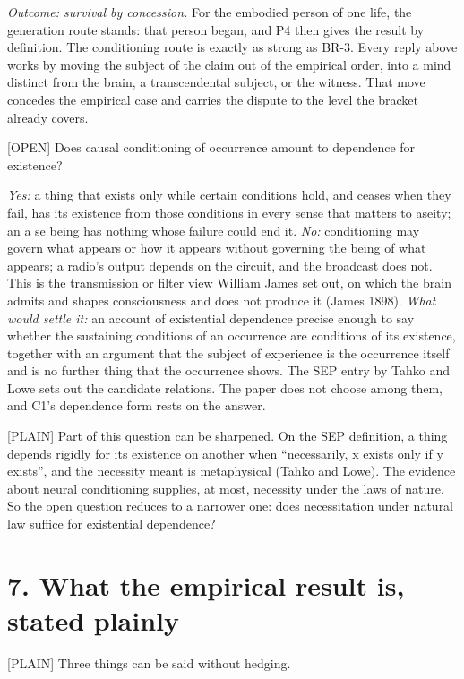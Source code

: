 \documentclass[11pt]{article}
\newcommand{\register}[1]{{\ttfamily\small #1}}
\begin{document}
\emph{Outcome: survival by concession.} For the embodied person of one life, the generation route stands: that person began, and P4 then gives the result by definition. The conditioning route is exactly as strong as BR-3. Every reply above works by moving the subject of the claim out of the empirical order, into a mind distinct from the brain, a transcendental subject, or the witness. That move concedes the empirical case and carries the dispute to the level the bracket already covers.

\register{[OPEN]} Does causal conditioning of occurrence amount to dependence for existence?

\emph{Yes:} a thing that exists only while certain conditions hold, and ceases when they fail, has its existence from those conditions in every sense that matters to aseity; an a se being has nothing whose failure could end it. \emph{No:} conditioning may govern what appears or how it appears without governing the being of what appears; a radio's output depends on the circuit, and the broadcast does not. This is the transmission or filter view William James set out, on which the brain admits and shapes consciousness and does not produce it (James 1898). \emph{What would settle it:} an account of existential dependence precise enough to say whether the sustaining conditions of an occurrence are conditions of its existence, together with an argument that the subject of experience is the occurrence itself and is no further thing that the occurrence shows. The SEP entry by Tahko and Lowe sets out the candidate relations. The paper does not choose among them, and C1's dependence form rests on the answer.

\register{[PLAIN]} Part of this question can be sharpened. On the SEP definition, a thing depends rigidly for its existence on another when ``necessarily, x exists only if y exists'', and the necessity meant is metaphysical (Tahko and Lowe). The evidence about neural conditioning supplies, at most, necessity under the laws of nature. So the open question reduces to a narrower one: does necessitation under natural law suffice for existential dependence?

\section*{7. What the empirical result is, stated plainly}

\register{[PLAIN]} Three things can be said without hedging.
\end{document}
